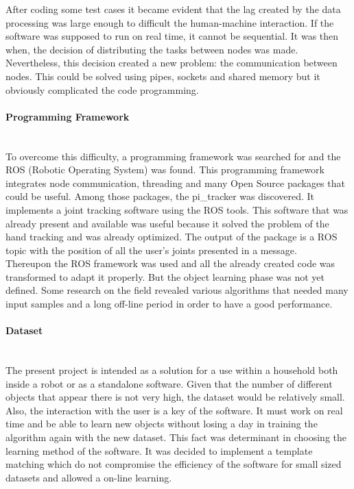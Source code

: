After coding some test cases it became evident that the lag created by the data processing was large enough to difficult the human-machine interaction. If the software was supposed to run on real time, it cannot be sequential. It was then when, the decision of distributing the tasks between nodes was made. Nevertheless, this decision created a new problem: the communication between nodes. This could be solved using pipes, sockets and shared memory but it obviously complicated the code programming. 
\\


\paragraph{Programming Framework}
\mbox{} \\

To overcome this difficulty, a programming framework was searched for and the ROS (Robotic Operating System) was found. This programming framework integrates node communication, threading and many Open Source packages that could be useful. Among those packages, the pi\_tracker was discovered. It implements a joint tracking software using the ROS tools. This software that was already present and available was useful because it solved the problem of the hand tracking and was already optimized. The output of the package is a ROS topic with the position of all the user's joints presented in a message. 
\\

Thereupon the ROS framework was used and all the already created code was transformed to adapt it properly. But the object learning phase was not yet defined. Some research on the field revealed various algorithms that needed many input samples and a long off-line period in order to have a good performance. 
\\


\paragraph{Dataset}
\mbox{} \\

The present project is intended as a solution for a use within a household both inside a robot or as a standalone software. Given that the number of different objects that appear there is not very high, the dataset would be relatively small. Also, the interaction with the user is a key of the software. It must work on real time and be able to learn new objects without losing a day in training the algorithm again with the new dataset. This fact was determinant in choosing the learning method of the software. It was decided to implement a template matching which do not compromise the efficiency of the software for small sized datasets and allowed a on-line learning. 
\\

